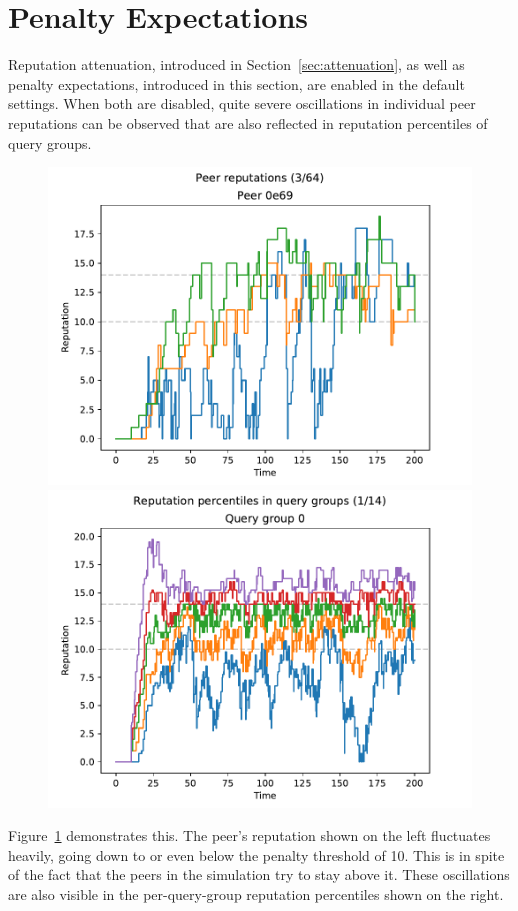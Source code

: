 \section{Penalty Expectations}
\label{sec:penalty_expectations}
Reputation attenuation, introduced in Section~\ref{sec:attenuation}, as well as
penalty expectations, introduced in this section, are enabled in the default
settings. When both are disabled, quite severe oscillations in individual peer
reputations can be observed that are also reflected in reputation percentiles of
query groups.

\begin{figure}[t]
\centering
\includegraphics[width=0.5\columnwidth]{figures/expectations_off_no_att_peer_reps_3_of_64}%
\includegraphics[width=0.5\columnwidth]{figures/expectations_off_no_att_rep_percs_1_of_14}
\label{fig:penalty_expectations_off_no_att_peer_reps_percs}
\end{figure}

Figure~\ref{fig:penalty_expectations_off_no_att_peer_reps_percs} demonstrates
this. The peer's reputation shown on the left fluctuates heavily, going down to
or even below the penalty threshold of 10. This is in spite of the fact that the
peers in the simulation try to stay above it. These oscillations are also
visible in the per-query-group reputation percentiles shown on the right.

